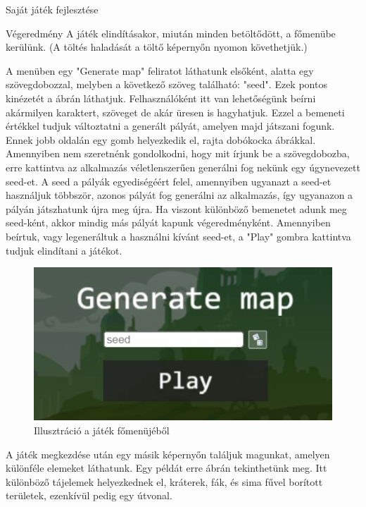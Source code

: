 \begin{MyChapter}{Saját játék fejlesztése}
\begin{MySection}{Végeredmény}
		A játék elindításakor, miután minden betöltődött, a főmenübe kerülünk. (A töltés haladását a töltő képernyőn nyomon követhetjük.)

		A menüben egy "Generate map" feliratot láthatunk elsőként, alatta egy szövegdobozzal, melyben a következő szöveg található: "seed". Ezek pontos kinézetét a  ábrán láthatjuk. Felhasználóként itt van lehetőségünk beírni akármilyen karaktert, szöveget de akár üresen is hagyhatjuk. Ezzel a bemeneti értékkel tudjuk változtatni a generált pályát, amelyen majd játszani fogunk.
		Ennek jobb oldalán egy gomb helyezkedik el, rajta dobókocka ábrákkal. Amennyiben nem szeretnénk gondolkodni, hogy mit írjunk be a szövegdobozba, erre kattintva az alkalmazás véletlenszerűen generálni fog nekünk egy úgynevezett seed-et.
		A seed a pályák egyediségéért felel, amennyiben ugyanazt a seed-et használjuk többször, azonos pályát fog generálni az alkalmazás, így ugyanazon a pályán játszhatunk újra meg újra. Ha viszont különböző bemenetet adunk meg seed-ként, akkor mindig más pályát kapunk végeredményként. 
		Amennyiben beírtuk, vagy legeneráltuk a használni kívánt seed-et, a "Play" gombra kattintva tudjuk elindítani a játékot.
		
		\begin{figure}[h!]
			\centering
			\includegraphics[scale=0.8]{kepek/jatekHasznalat/fomenu}
			\caption{Illusztráció a játék főmenüjéből}
			\label{fig:jatekHasznalat:fomenu}
		\end{figure}
		
		A játék megkezdése után egy másik képernyőn találjuk magunkat, amelyen különféle elemeket láthatunk. Egy példát erre  ábrán tekinthetünk meg. Itt különböző tájelemek helyezkednek el, kráterek, fák, és sima fűvel borított területek, ezenkívül pedig egy útvonal. 
		

\end{MySection}
\end{MyChapter}
